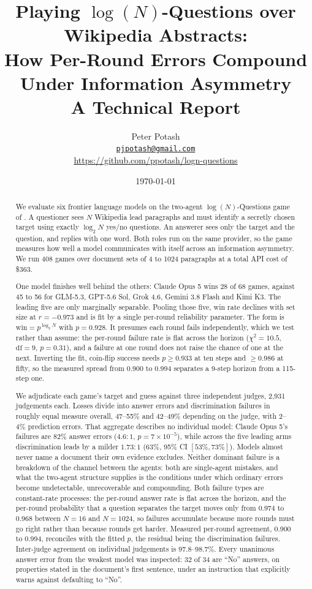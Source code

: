 \documentclass[11pt]{article}
\title{Playing $\log(N)$-Questions over Wikipedia Abstracts:\\
How Per-Round Errors Compound Under Information Asymmetry\\
\large A Technical Report}
\author{Peter Potash\\
\normalsize\href{mailto:pjpotash@gmail.com}{\texttt{pjpotash@gmail.com}}\\
\normalsize\url{https://github.com/ppotash/logn-questions}}
\date{\today}
\begin{document}
\maketitle

\begin{abstract}
We evaluate six frontier language models on the two-agent $\log(N)$-Questions
game of \citet{potash2019}. A questioner sees $N$ Wikipedia
lead paragraphs and must identify a secretly chosen target using exactly
$\log_2 N$ yes/no questions. An answerer sees only the target and the question,
and replies with one word. Both roles run on the same provider, so the game
measures how well a model communicates with itself across an information
asymmetry. We run 408 games over document sets of 4 to 1024 paragraphs at a
total API cost of \$363.

One model finishes well behind the others: Claude Opus 5 wins 28 of 68 games,
against 45 to 56 for GLM-5.3, GPT-5.6 Sol, Grok 4.6, Gemini 3.8 Flash and Kimi
K3. The leading five are only marginally separable. Pooling those five, win rate
declines with set size at $r=-0.973$ and is fit by a single per-round
reliability parameter. The form is $\text{win}=p^{\log_2 N}$ with $p=0.928$. It
presumes each round fails independently, which we test rather than assume: the
per-round failure rate is flat across the horizon ($\chi^{2}=10.5$,
$\mathrm{df}=9$, $p=0.31$), and a failure at one round does not raise the chance
of one at the next. Inverting the fit, coin-flip success needs $p \ge 0.933$ at
ten steps and $\ge 0.986$ at fifty, so the measured spread from 0.900 to 0.994
separates a 9-step horizon from a 115-step one.

We adjudicate each game's target and guess against three independent judges,
2{,}931 judgements each. Losses divide into answer errors and discrimination
failures in roughly equal measure overall, 47--55\% and 42--49\% depending on
the judge, with 2--4\% prediction errors. That aggregate describes no individual
model: Claude Opus 5's failures are $82\%$ answer errors ($4.6{:}1$,
$p=7\times10^{-5}$), while across the five leading arms discrimination leads by
a milder $1.73{:}1$ (63\%, 95\% CI $[53\%,73\%]$). Models almost never name a document their own evidence excludes. Neither
dominant failure is a breakdown of the channel between the agents: both are
single-agent mistakes, and what the two-agent structure supplies is the
conditions under which ordinary errors become undetectable, unrecoverable and
compounding. Both failure types are constant-rate processes: the per-round answer rate is flat across the horizon, and the
per-round probability that a question separates the target moves only from 0.974
to 0.968 between $N{=}16$ and $N{=}1024$, so failures accumulate because more
rounds must go right rather than because rounds get harder.
Measured per-round agreement, 0.900 to 0.994, reconciles with the fitted $p$,
the residual being the discrimination failures. Inter-judge agreement on
individual judgements is 97.8--98.7\%. Every unanimous answer error from the
weakest model was inspected: 32 of 34 are ``No'' answers, on properties stated
in the document's first sentence, under an instruction that explicitly warns
against defaulting to ``No''.


\end{abstract}
\end{document}
